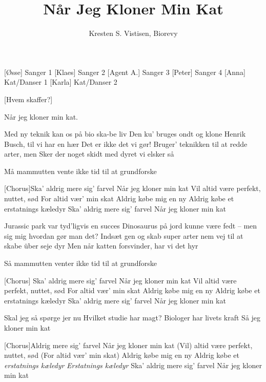 \documentclass[a4paper,12pt]{article}
\title{Når Jeg Kloner Min Kat}
\author{Kresten S. Vistisen, Biorevy}
\begin{document}
\maketitle

\begin{roles}
	[Øsse] Sanger 1
	[Klaes] Sanger 2
	[Agent A.] Sanger 3
	[Peter] Sanger 4
	[Anna] Kat/Danser 1
	[Karla] Kat/Danser 2
\end{roles}


\begin{props}
	[Hvem skaffer?]
\end{props}

\begin{song}

Når jeg kloner min kat.

Med ny teknik kan os på bio ska-be liv
Den ku' bruges ondt og klone Henrik Busch, til vi har en hær
Det er ikke det vi gør!
Bruger' teknikken til at redde arter, men
Sker der noget skidt med dyret vi elsker så

Må mammutten vente
ikke tid til at grundforske

[Chorus]Ska' aldrig mere sig' farvel
Når jeg kloner min kat
Vil altid være perfekt, nuttet, sød
For altid vær' min skat
Aldrig købe mig en ny
Aldrig købe et erstatnings kæledyr
Ska' aldrig mere sig' farvel
Når jeg kloner min kat

Jurassic park var tyd'ligvis en succes
Dinosaurus på jord kunne være fedt -- men sig mig hvordan gør man det?
Indsæt gen og skab super arter
nem vej til at skabe über seje dyr
Men når katten forsvinder, har vi det hyr

Så mammutten venter
ikke tid til at grundforske

[Chorus]
Ska' aldrig mere sig' farvel
Når jeg kloner min kat
Vil altid være perfekt, nuttet, sød
For altid vær' min skat
Aldrig købe mig en ny
Aldrig købe et erstatnings kæledyr
Ska' aldrig mere sig' farvel
Når jeg kloner min kat

Skal jeg så spørge jer nu
Hvilket studie har magt?
Biologer har livets kraft
Så jeg kloner min kat

[Chorus]Aldrig mere sig' farvel
Når jeg kloner min kat
(Vil) altid være perfekt, nuttet, sød
(For altid vær' min skat)
Aldrig købe mig en ny
Aldrig købe et \emph{erstatnings kæledyr}
\emph{Erstatnings kæledyr}
Ska' aldrig mere sig' farvel
Når jeg kloner min kat


\end{song}
\end{document}
